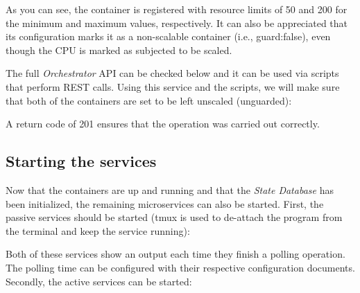 \documentclass[12pt]{article}
\begin{document}
As you can see, the container is registered with resource limits of 50 and 200 for the minimum and maximum values, respectively. It can also be appreciated that its configuration marks it as a non-scalable container (i.e., guard:false), even though the CPU is marked as subjected to be scaled.

The full \textit{Orchestrator} API can be checked below and it can be used via scripts that perform REST calls. Using this service and the scripts, we will make sure that both of the containers are set to be left unscaled (unguarded): \newline

\noindent {} \newline
{} \newline

A return code of 201 ensures that the operation was carried out correctly.

\subsection{Starting the services}

Now that the containers are up and running and that the \textit{State Database} has been initialized, the remaining microservices can also be started. First, the passive services should be started (tmux is used to de-attach the program from the terminal and keep the service running): \newline

\noindent {} \newline
{} \newline

Both of these services show an output each time they finish a polling operation. The polling time can be configured with their respective configuration documents. Secondly, the active services can be started: \newline

\noindent {} \newline
{} \newline
\end{document}
